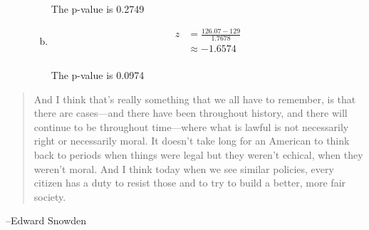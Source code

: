 \documentclass[letterpaper, landscape]{exam}
\begin{document}
\begin{description}
\begin{enumerate}[(a)]
            The p-value is 0.2749

          \item 
            \begin{align*}
              z & = \frac{126.07 - 129}{1.7678} \\
                & \approx -1.6574 \\
            \end{align*}

            The p-value is 0.0974 

        \end{enumerate}

  \end{description}

  \else
    \vspace{10 cm}
    \begin{quote}
      \begin{em}
        And I think that's really something that we all have to remember, is
        that there are cases---and there have been throughout history, and there
        will continue to be throughout time---where what is lawful is not
        necessarily right or necessarily moral. It doesn't take long for an
        American to think back to periods when things were legal but they
        weren't echical, when they weren't moral. And I think today when we see
        similar policies, every citizen has a duty to resist those and to try to
        build a better, more fair society.
      \end{em}
    \end{quote}
    \hspace{1 cm}--Edward Snowden
  \fi
\end{document}

